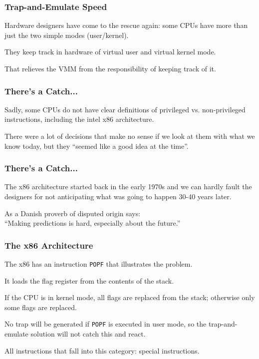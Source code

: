 \begin{frame}
\frametitle{Trap-and-Emulate Speed}

Hardware designers have come to the rescue again: some CPUs have more than just the two simple modes (user/kernel).

They keep track in hardware of virtual user and virtual kernel mode. 

That relieves the VMM from the responsibility of keeping track of it.


\end{frame}

\begin{frame}
\frametitle{There's a Catch...}

Sadly, some CPUs do not have clear definitions of privileged vs. non-privileged instructions, including the intel x86 architecture. 

There were a lot of decisions that make no sense if we look at them with what we know today, but they ``seemed like a good idea at the time''. 

\end{frame}

\begin{frame}
\frametitle{There's a Catch...}

The x86 architecture started back in the early 1970s and we can hardly fault the designers for not anticipating what was going to happen 30-40 years later. 

As a Danish proverb of disputed origin says:\\
\quad ``Making predictions is hard, especially about the future.''


\end{frame}

\begin{frame}
\frametitle{The x86 Architecture}

The x86 has an instruction \texttt{POPF} that illustrates the problem. 

It loads the flag register from the contents of the stack. 

If the CPU is in kernel mode, all flags are replaced from the stack; otherwise only some flags are replaced. 

No trap will be generated if \texttt{POPF} is executed in user mode, so the trap-and-emulate solution will not catch this and react. 

All instructions that fall into this category: \alert{special instructions}.

\end{frame}

